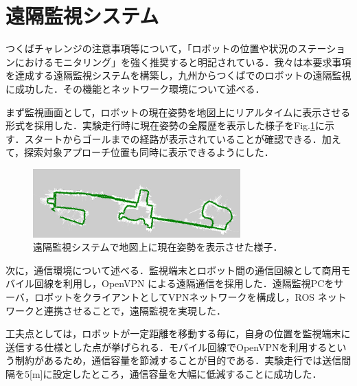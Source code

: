 \documentclass[10pt,a4paper]{jarticle}
\begin{document}
\section{遠隔監視システム}
\label{sec:remote_monitor}
つくばチャレンジの注意事項等について，「ロボットの位置や状況のステーションにおけるモニタリング」を強く推奨すると明記されている．我々は本要求事項を達成する遠隔監視システムを構築し，九州からつくばでのロボットの遠隔監視に成功した．その機能とネットワーク環境について述べる．

まず監視画面として，ロボットの現在姿勢を地図上にリアルタイムに表示させる形式を採用した．実験走行時に現在姿勢の全履歴を表示した様子をFig.\ref{monitor}に示す．スタートからゴールまでの経路が表示されていることが確認できる．加えて，探索対象アプローチ位置も同時に表示できるようにした．

\begin{figure}
    \centering
    \includegraphics[width=8cm]{fig/png/monitor.png}
    \caption{遠隔監視システムで地図上に現在姿勢を表示させた様子．}
    \label{monitor}
\end{figure}

次に，通信環境について述べる．監視端末とロボット間の通信回線として商用モバイル回線を利用し，OpenVPN \cite{openvpn} による遠隔通信を採用した．遠隔監視PCをサーバ，ロボットをクライアントとしてVPNネットワークを構成し，ROS ネットワークと連携させることで，遠隔監視を実現した．

工夫点としては，ロボットが一定距離を移動する毎に，自身の位置を監視端末に送信する仕様とした点が挙げられる．モバイル回線でOpenVPNを利用するという制約があるため，通信容量を節減することが目的である．実験走行では送信間隔を5[m]に設定したところ，通信容量を大幅に低減することに成功した．
\end{document}
